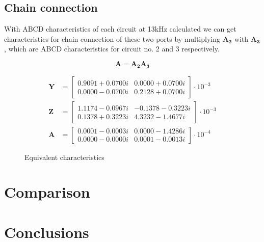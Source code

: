\documentclass[notitlepage, a4paper, 11pt]{article}
\begin{document}
	\subsection{Chain connection}
	With ABCD characteristics of each circuit at 13kHz calculated we can get characteristics for chain connection of these two-ports by multiplying $\mathbf{A_2}$ with $\mathbf{A_3}$, which are ABCD characteristics for circuit no. 2 and 3 respectively.
	
	\begin{equation}
		\mathbf{A} = \mathbf{A_2} \mathbf{A_3}
	\end{equation}
	
		\begin{figure}[H]
		\begin{align*}
			\mathbf{Y} &= 
			\begin{bmatrix}
				0.9091 + 0.0700i  & 0.0000 + 0.0700i \\
				0.0000 - 0.0700i  & 0.2128 + 0.0700i
			\end{bmatrix}
			\cdot 10^{-3}
			\\
			\mathbf{Z} &= 
			\begin{bmatrix}
				1.1174 - 0.0967i & -0.1378 - 0.3223i \\
				0.1378 + 0.3223i & 4.3232 - 1.4677i
			\end{bmatrix}
			\cdot 10^{-3}
			\\
			\mathbf{A} &= 
			\begin{bmatrix}
				0.0001 - 0.0003i & 0.0000 - 1.4286i \\
				0.0000 - 0.0000i & 0.0001 - 0.0013i
			\end{bmatrix}
			\cdot 10^{-4}
		\end{align*}
		\caption{Equivalent characteristics}
		\end{figure}
	
	\section{Comparison}
	\section{Conclusions}

	
	
	
\end{document}
